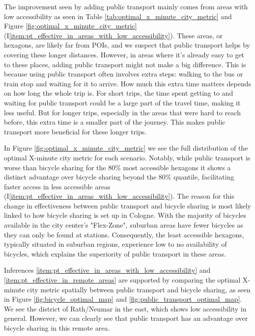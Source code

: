 The improvement seen by adding public transport mainly comes from areas with low accessibility as seen in Table \ref{tab:optimal_x_minute_city_metric} and Figure \ref{fig:optimal_x_minute_city_metric} (I\ref{item:pt_effective_in_areas_with_low_accessibility}).
These areas, or hexagons, are likely far from POIs, and we suspect that public transport helps by covering these longer distances. 
However, in areas where it's already easy to get to these places, adding public transport might not make a big difference. 
This is because using public transport often involves extra steps: walking to the bus or train stop and waiting for it to arrive. 
How much this extra time matters depends on how long the whole trip is.
For short trips, the time spent getting to and waiting for public transport could be a large part of the travel time, making it less useful. 
But for longer trips, especially in the areas that were hard to reach before, this extra time is a smaller part of the journey. 
This makes public transport more beneficial for these longer trips. 

In Figure \ref{fig:optimal_x_minute_city_metric} we see the full distribution of the optimal X-minute city metric for each scenario.
Notably, while public transport is worse than bicycle sharing for the 80\% most accessible hexagons it shows a distinct advantage over bicycle sharing beyond the 80\% quantile, facilitating faster access in less accessible areas (I\ref{item:pt_effective_in_areas_with_low_accessibility}).
The reason for this change in effectiveness between public transport and bicycle sharing is most likely linked to how bicycle sharing is set up in Cologne. 
With the majority of bicycles available in the city center's "Flex-Zone", suburban areas have fewer bicycles as they can only be found at stations.
Consequently, the least accessible hexagons, typically situated in suburban regions, experience low to no availability of bicycles, which explains the superiority of public transport in these areas. 

Inferences \ref{item:pt_effective_in_areas_with_low_accessibility} and \ref{item:pt_effective_in_remote_areas} are supported by comparing the optimal X-minute city metric spatially between public transport and bicycle sharing, as seen in Figure \ref{fig:bicycle_optimal_map} and \ref{fig:public_transport_optimal_map}.
We see the district of Rath/Neumar in the east, which shows low accessibility in general.
However, we can clearly see that public transport has an advantage over bicycle sharing in this remote area.

